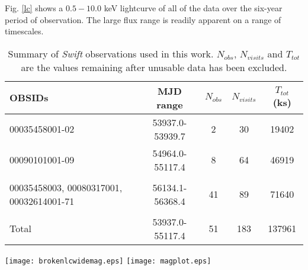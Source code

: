 \documentclass[useAMS,usenatbib]{sam}
\begin{document}

Fig. \ref{lc} shows a $0.5 - 10.0$ keV lightcurve of all of the data over the six-year period of observation. The large flux range is readily apparent on a range of
timescales.

\begin{table}
 	\centering
	\begin{tabular}{| l | c | c | c | c |} \hline
		
	OBSIDs 							& MJD range 		& $N_{obs}$ 	& $N_{visits}$ 	& $T_{tot}$ (ks) 	\\ \hline \hline	
	

	00035458001-02						& 53937.0-53939.7	& 2		& 30		& 19402		\\ \hline
	00090101001-09						& 54964.0-55117.4	& 8		& 64 		& 46919		\\ \hline
	\multirow{3}{2.1cm}{00035458003, 00080317001, 00032614001-71} 	& 	&  		&  		& 		\\ 
								& 56134.1-56368.4	& 41		& 89		& 71640		\\
								&			&		&		&		\\ \hline
	
	Total							& 53937.0-55117.4	& 51		& 183		& 137961	\\ \hline

	\end{tabular}
		
	\caption{Summary of {\it Swift} observations used in this work. $N_{obs}$, $N_{visits}$ and $T_{tot}$  are the values remaining after unusable data has been
excluded.}
	\label{obstable}

\end{table}


\begin{figure*}
	\texttt{[image: brokenlcwidemag.eps]}
	\texttt{[image: magplot.eps]}
	\caption{{\it Left:} The SWIFT X-ray lightcurve of NGC 1365, with a broken axis where data were not taken. {\it Right:} Expanded plot of the highlighted section
of the total light curve, during which more intensive {\it SWIFT} monitoring was taking place.}
	\label{lc}
\end{figure*}

\end{document}
